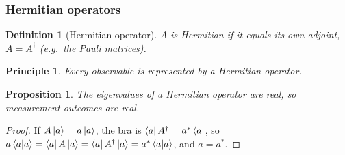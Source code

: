 \documentclass{article}
\newtheorem{principle}{Principle}
\newtheorem{definition}{Definition}
\newtheorem{proposition}{Proposition}
\begin{document}
\subsubsection{Hermitian operators}
\begin{definition}[Hermitian operator]
    \label{def:hermitian}
    $A$ is Hermitian if it equals its own adjoint, $A = A^\dagger$ (e.g.\ the Pauli matrices).
\end{definition}
\begin{principle}
    \label{prin:hermitian}
    Every observable is represented by a Hermitian operator.
\end{principle}
\begin{proposition}
    The eigenvalues of a Hermitian operator are real, so measurement outcomes are real.
\end{proposition}
\begin{proof}
    If $A\ket{a} = a\ket{a}$, the bra is $\bra{a}A^\dagger = a^*\bra{a}$, so $a\braket{a|a} = \bra{a}A\ket{a} = \bra{a}A^\dagger\ket{a} = a^*\braket{a|a}$, and $a = a^*$.
\end{proof}
\end{document}
